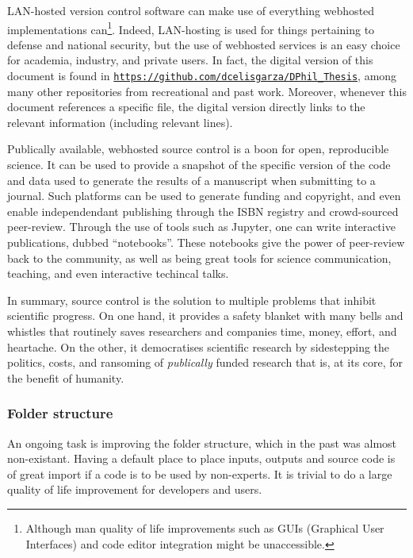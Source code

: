 LAN-hosted version control software can make use of everything webhosted implementations can\footnote{Although man quality of life improvements such as GUIs (Graphical User Interfaces) and code editor integration might be unaccessible.}. Indeed, LAN-hosting is used for things pertaining to defense and national security, but the use of webhosted services is an easy choice for academia, industry, and private users. In fact, the digital version of this document is found in \href{https://github.com/dcelisgarza/DPhil_Thesis}{\texttt{https://github.com/dcelisgarza/DPhil\_Thesis}}, among many other repositories from recreational and past work. Moreover, whenever this document references a specific file, the digital version directly links to the relevant information (including relevant lines).

Publically available, webhosted source control is a boon for open, reproducible science. It can be used to provide a snapshot of the specific version of the code and data used to generate the results of a manuscript when submitting to a journal. Such platforms can be used to generate funding and copyright, and even enable independendant publishing through the ISBN registry and crowd-sourced peer-review. Through the use of tools such as Jupyter, one can write interactive publications, dubbed ``notebooks''. These notebooks give the power of peer-review back to the community, as well as being great tools for science communication, teaching, and even interactive techincal talks.

In summary, source control is the solution to multiple problems that inhibit scientific progress. On one hand, it provides a safety blanket with many bells and whistles that routinely saves researchers and companies time, money, effort, and heartache. On the other, it democratises scientific research by sidestepping the politics, costs, and ransoming of \emph{publically} funded research that is, at its core, for the benefit of humanity.

\subsubsection{Folder structure}

An ongoing task is improving the folder structure, which in the past was almost non-existant. Having a default place to place inputs, outputs and source code is of great import if a code is to be used by non-experts. It is trivial to do a large quality of life improvement for developers and users.

